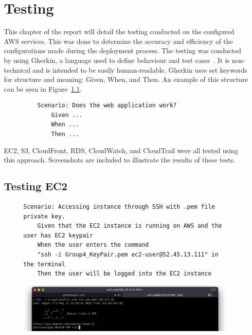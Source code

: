 \chapter{Testing}\label{ch:testing}

This chapter of the report will detail the testing conducted on the configured AWS services.
This was done to determine the accuracy and efficiency of the configurations made during the deployment process.
The testing was conducted by using Gherkin, a language used to define behaviour and test
cases~\parencite{dos2018automated}.
It is non-technical and is intended to be easily human-readable.
Gherkin uses set keywords for structure and meaning: Given, When, and Then.
An example of this structure can be seen in Figure~\ref{fig:gherkin}.

\begin{figure}[!htbp]
    \centering
    \begin{verbatim}
    Scenario: Does the web application work?
        Given ...
        When ...
        Then ...
    \end{verbatim}
    \label{fig:gherkin}
\end{figure}

EC2, S3, CloudFront, RDS, CloudWatch, and CloudTrail were all tested using this approach.
Screenshots are included to illustrate the results of these tests.

\section{Testing EC2}\label{sec:testing-ec2}

\begin{figure}[!htbp]
    \centering
    \begin{verbatim}
Scenario: Accessing instance through SSH with .pem file private key.
    Given that the EC2 instance is running on AWS and the user has EC2 keypair
    When the user enters the command
    "ssh -i Group4_KeyPair.pem ec2-user@52.45.13.111" in the terminal
    Then the user will be logged into the EC2 instance
    \end{verbatim}
    \label{fig:accessing-instance-ec2}
\end{figure}

\begin{figure}[!htbp]
    \centering
    \includegraphics[width=\textwidth]{resources/ec2/ec2-logged-in}
    \label{fig:ec2-test-logged-in}
\end{figure}

